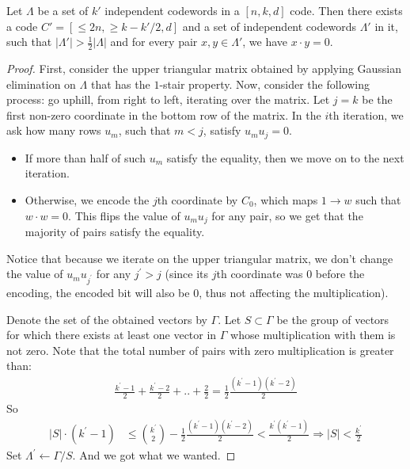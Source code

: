 \documentclass[manuscript,screen,review]{acmart}
\begin{document}
\fi

\begin{claim} 
  \label{claim:commute}
Let $\Lambda$ be a set of $k'$ independent codewords in a $[n,k,d]$ code. Then there exists a code $C' = [\leq 2n, \geq k-k'/2, d]$ and a set of independent codewords $\Lambda'$ in it, such that $|\Lambda'| > \frac{1}{2}|\Lambda|$ and for every pair $x,y \in \Lambda'$, we have $x\cdot y = 0$.
\end{claim}
\begin{proof} 
  First, consider the upper triangular matrix obtained by applying Gaussian elimination on $\Lambda$ that has the $1$-stair property. Now, consider the following process: go uphill, from right to left, iterating over the matrix. Let $j=k$ be the first non-zero coordinate in the bottom row of the matrix. In the $i$th iteration, we ask how many rows $u_{m}$, such that $m < j$, satisfy $u_{m} u_{j} = 0$.
  \begin{itemize}
    \item If more than half of such $u_{m}$ satisfy the equality, then we move on to the next iteration. 
    \item Otherwise, we encode the $j$th coordinate by $C_{0}$, which maps $1 \rightarrow w$ such that $w\cdot w = 0$. This flips the value of $u_{m} u_{j}$ for any pair, so we get that the majority of pairs satisfy the equality. 
  \end{itemize}

Notice that because we iterate on the upper triangular matrix, we don't change the value of $u_{m}u_{j^{\prime}}$ for any $j^{\prime} > j$ (since its $j$th coordinate was $0$ before the encoding, the encoded bit will also be $0$, thus not affecting the multiplication).

Denote the set of the obtained vectors by $\Gamma$. Let $S\subset \Gamma$ be the group of vectors for which there exists at least one vector in $\Gamma$ whose multiplication with them is not zero. Note that the total number of pairs with zero multiplication is greater than:
  \begin{equation*}
    \begin{split}
      \frac{k^{\prime}-1}{2} + \frac{k^{\prime}-2}{2} + .. + \frac{2}{2} = \frac{1}{2} \frac{(k^{\prime}-1)(k^{\prime}-2)}{2}
    \end{split}
  \end{equation*}
  So 
  \begin{equation*}
    \begin{split}
       |S| \cdot (k^{\prime}-1) & \le { k^\prime \choose 2 } -  \frac{1}{2} \frac{(k^{\prime}-1)(k^{\prime}-2)}{2}  < \frac{k^{\prime}(k^{\prime}-1)}{2}
       \Rightarrow |S| < \frac{k^{\prime}}{2}
    \end{split}
  \end{equation*}
  Set $\Lambda^{\prime} \leftarrow \Gamma / S$. And we got what we wanted.

\end{proof}
\end{document}
